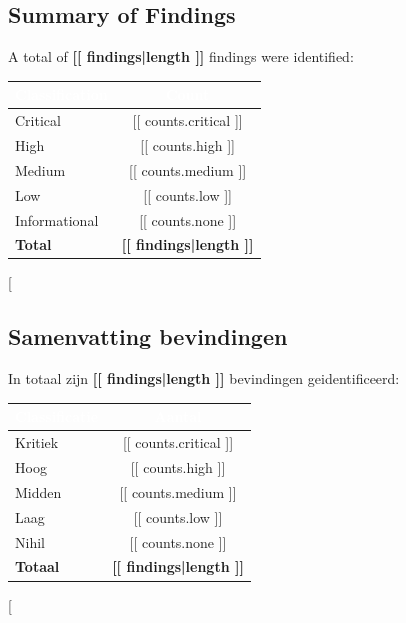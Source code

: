 {{{{\subsection{Summary of Findings}

A total of \textbf{[[ findings|length ]]} findings were identified:

\begin{center}
\begin{tabular}{|l|c|}
  \hline
  \rowcolor{rijkblauw}\textcolor{white}{\textbf{Classification}} & \textcolor{white}{\textbf{Count}} \\
  \hline
  \textcolor{opaars}{Critical} & [[ counts.critical ]] \\
  \textcolor{ored}{High} & [[ counts.high ]] \\
  \textcolor{oorange}{Medium} & [[ counts.medium ]] \\
  \textcolor{oyellow}{Low} & [[ counts.low ]] \\
  \textcolor{olichtblauw}{Informational} & [[ counts.none ]] \\
  \hline
  \textbf{Total} & \textbf{[[ findings|length ]]} \\
  \hline
\end{tabular}
\end{center}
[%
\subsection{Samenvatting bevindingen}

In totaal zijn \textbf{[[ findings|length ]]} bevindingen geidentificeerd:

\begin{center}
\begin{tabular}{|l|c|}
  \hline
  \rowcolor{rijkblauw}\textcolor{white}{\textbf{Classificatie}} & \textcolor{white}{\textbf{Aantal}} \\
  \hline
  \textcolor{opaars}{Kritiek} & [[ counts.critical ]] \\
  \textcolor{ored}{Hoog} & [[ counts.high ]] \\
  \textcolor{oorange}{Midden} & [[ counts.medium ]] \\
  \textcolor{oyellow}{Laag} & [[ counts.low ]] \\
  \textcolor{olichtblauw}{Nihil} & [[ counts.none ]] \\
  \hline
  \textbf{Totaal} & \textbf{[[ findings|length ]]} \\
  \hline
\end{tabular}
\end{center}
[%

}}}}
